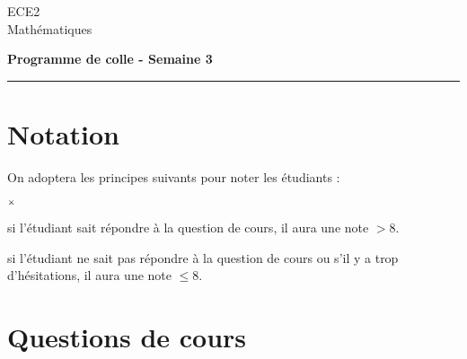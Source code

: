 \documentclass[11pt]{article}%
\begin{document}
\begin{flushleft}
ECE2 \\
Mathématiques
\end{flushleft}


\vspace{0.1cm}

\begin{center}
\textbf{\Large{Programme de colle - Semaine 3}}
\end{center}

\hrule

\vspace*{0,2cm}

\section*{Notation}

\noindent
On adoptera les principes suivants pour noter les étudiants :
\begin{noliste}{$\scriptstyle \times$}
\item si l'étudiant sait répondre à la question de cours, il 
aura une note $> 8$.
\item si l'étudiant ne sait pas répondre à la question de 
cours ou s'il y a trop d'hésitations, il aura une note $\leq 8$.
\end{noliste}

\section*{Questions de cours}
\end{document}
